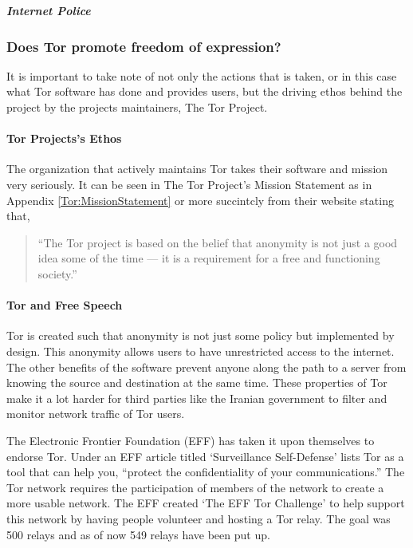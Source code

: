 \documentclass[11pt]{article}
\begin{document}
\begin{multicols}{2}
\subparagraph{Internet Police}


\subsubsection{Does Tor promote freedom of expression?}

It is important to take note of not only the actions that is taken, or in this
case what Tor software has done and provides users, but the driving ethos behind
the project by the projects maintainers, The Tor Project.

\paragraph{Tor Projects's Ethos}

The organization that actively maintains Tor takes their software and mission
very seriously. It can be seen in The Tor Project's Mission Statement as in
Appendix \ref{Tor:MissionStatement} or more succintcly from their website
stating that,


\begin{quotation} 
  
  ``The Tor project is based on the belief that anonymity is not just a good
  idea some of the time — it is a requirement for a free and functioning
  society.''\cite{Tor:Users}

\end{quotation}



%

\paragraph{Tor and Free Speech}

Tor is created such that anonymity is not just some policy but implemented by
design. This anonymity allows users to have unrestricted access to the internet.
The other benefits of the software prevent anyone along the path to a server
from knowing the source and destination at the same time. These properties of
Tor make it a lot harder for third parties like the Iranian government to filter
and monitor network traffic of Tor users.

The Electronic Frontier Foundation (EFF) has taken it upon themselves to
endorse Tor. Under an EFF article titled `Surveillance Self-Defense' lists Tor
as a tool that can help you, ``protect the confidentiality of your
communications.''\cite{EFF:Tor} The Tor network requires the participation
of members of the network to create a more usable network. The EFF created `The
EFF Tor Challenge' to help support this network by having people volunteer and
hosting a Tor relay.\cite{EFF:TorChallenge} The goal was 500 relays and as of 
now 549 relays have been put up.\cite{EFF:TorChallenge}


\end{multicols}
\end{document}

